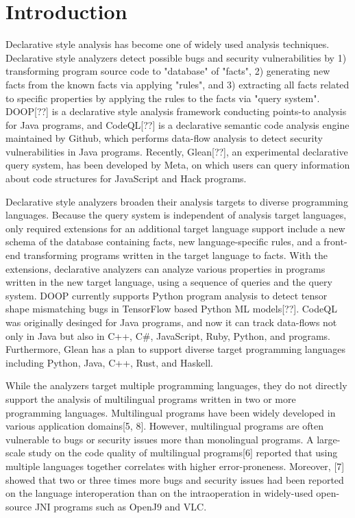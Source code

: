 \section{Introduction}
Declarative style analysis has become one of widely used analysis techniques.
Declarative style analyzers detect possible bugs and
security vulnerabilities by 1) transforming program source code to "database"
of "facts", 2) generating new facts from the known facts via applying
"rules", and 3) extracting all facts related to specific properties by
applying the rules to the facts via "query system".  DOOP[??] is a
declarative style analysis framework conducting points-to analysis for Java
programs, and CodeQL[??] is a declarative semantic code analysis engine
maintained by Github, which performs data-flow analysis to detect security
vulnerabilities in Java programs.  Recently, Glean[??], an experimental
declarative query system, has been developed by Meta, on which users can query
information about code structures for JavaScript and Hack programs.

Declarative style analyzers broaden their analysis targets to
diverse programming languages. Because the query system is independent of
analysis target languages, only required extensions for an additional target
language support include a new schema of the database containing facts,
new language-specific rules, and a front-end transforming programs written in the
target language to facts. With the extensions, declarative analyzers can
analyze various properties in programs written in the new target language,
using a sequence of queries and the query system.  DOOP currently supports
Python program analysis to detect tensor shape mismatching bugs in TensorFlow
based Python ML models[??]. CodeQL was originally desinged for Java programs,
and now it can track data-flows not only in Java but also in C++, C\#, JavaScript,
Ruby, Python, and  programs.  Furthermore, Glean has a plan to support
diverse target programming languages including Python, Java, C++, Rust, and
Haskell.

While the analyzers target multiple programming languages, they do not directly
support the analysis of multilingual programs written in two or more programming
languages. Multilingual programs have been widely developed in various
application domains[5, 8]. However, multilingual programs are often vulnerable
to bugs or security issues more than monolingual programs. A large-scale study
on the code quality of multilingual programs[6] reported that using multiple
languages together correlates with higher error-proneness. Moreover, [7] showed
that two or three times more bugs and security issues had been reported on the
language interoperation than on the intraoperation in widely-used open-source
JNI programs such as OpenJ9 and VLC.

